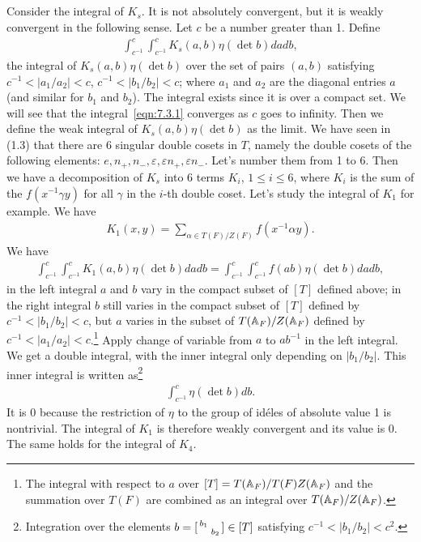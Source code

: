 \subsection{}
Consider the integral of $K_s$.
It is not absolutely convergent, but it is weakly convergent in the following sense.
Let $c$ be a number greater than 1.
Define
\begin{align}
    \label{eqn:7.3.1}
    \int_{c^{-1}}^{c} \int_{c^{-1}}^{c} K_{s}(a, b) \eta(\det b) da db,
\end{align}
the integral of $K_s(a, b)\eta(\det b)$ over the set of pairs $(a, b)$ satisfying $c^{-1} < |a_1 / a_2| < c$, $c^{-1} < |b_1 / b_2| < c$; where $a_1$ and $a_2$ are the diagonal entries $a$ (and similar for $b_1$ and $b_2$).
The integral exists since it is over a compact set.
We will see that the integral~\eqref{eqn:7.3.1} converges as $c$ goes to infinity.
Then we define the weak integral of $K_s(a, b) \eta(\det b)$ as the limit.
We have seen in (1.3) that there are 6 singular double cosets in $T$, namely the double cosets of the following elements: $e, n_+, n_-, \varepsilon, \varepsilon n_+, \varepsilon n_-$.
Let's number them from 1 to 6.
Then we have a decomposition of $K_s$ into 6 terms $K_i$, $1\leq i\leq 6$, where $K_i$ is the sum of the $f(x^{-1} \gamma y)$ for all $\gamma$ in the $i$-th double coset.
Let's study the integral of $K_1$ for example.
We have
\begin{align*}
    K_1(x, y) = \sum_{\alpha \in T(F) / Z(F)} f(x^{-1} \alpha y).
\end{align*}
We have
\begin{align*}
    \int_{c^{-1}}^{c} \int_{c^{-1}}^{c} K_{1}(a, b) \eta (\det b) da db = \int_{c^{-1}}^{c} \int_{c^{-1}}^{c} f(ab) \eta (\det b) da db,
\end{align*}
in the left integral $a$ and $b$ vary in the compact subset of $[T]$ defined above;
in the right integral $b$ still varies in the compact subset of $[T]$ defined by $c^{-1} < |b_1 / b_2| < c$, but $a$ varies in the subset of $T(\mathbb{A}_F)/Z(\mathbb{A}_F)$ defined by $c^{-1} < |a_1/a_2| < c$.\footnote{The integral with respect to $a$ over $[T] = T(\mathbb{A}_F) / T(F)Z(\mathbb{A}_F)$ and the summation over $T(F)$ are combined as an integral over $T(\mathbb{A}_F)/Z(\mathbb{A}_F)$.}
Apply change of variable from $a$ to $ab^{-1}$ in the left integral.
We get a double integral, with the inner integral only depending on $|b_1 / b_2|$.
This inner integral is written as\footnote{Integration over the elements $b = [\begin{smallmatrix} b_1 &  \\  & b_2 \end{smallmatrix}] \in [T]$ satisfying $c^{-1} < |b_1 / b_2| < c^2$.}
\begin{align*}
    \int_{c^{-1}}^{c} \eta(\det b) db.
\end{align*}
It is 0 because the restriction of $\eta$ to the group of id\'eles of absolute value 1 is nontrivial.
The integral of $K_1$ is therefore weakly convergent and its value is 0.
The same holds for the integral of $K_4$.

